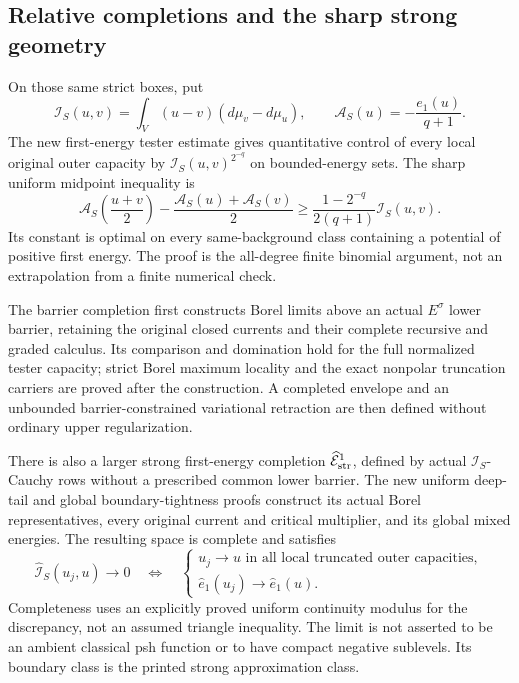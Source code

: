 \documentclass[11pt,a4paper]{article}
\numberwithin{equation}{section}
\theoremstyle{definition}
\theoremstyle{remark}
\begin{document}
\subsection{Relative completions and the sharp strong geometry}

On those same strict boxes, put
\[
 \mathscr I_S(u,v)=\int_V(u-v)(d\mu_v-d\mu_u),\qquad
 \mathscr A_S(u)=-\frac{e_1(u)}{q+1}.
 \tag{M12}
\]
The new first-energy tester estimate gives quantitative
control of every local original outer capacity by
$\mathscr I_S(u,v)^{2^{-q}}$ on bounded-energy sets.
The sharp uniform midpoint inequality is
\[
 \mathscr A_S\left(\frac{u+v}{2}\right)
       -\frac{\mathscr A_S(u)+\mathscr A_S(v)}2
      \geq\frac{1-2^{-q}}{2(q+1)}\mathscr I_S(u,v).
 \tag{M13}
\]
Its constant is optimal on every same-background class
containing a potential of positive first energy.
The proof is the all-degree finite binomial argument,
not an extrapolation from a finite numerical check.

The barrier completion first constructs Borel limits
above an actual $E^\sigma$ lower barrier, retaining
the original closed currents and their complete
recursive and graded calculus. Its comparison and
domination hold for the full normalized tester capacity;
strict Borel maximum locality and the exact nonpolar
truncation carriers are proved after the construction.
A completed envelope and an unbounded barrier-constrained
variational retraction are then defined without ordinary
upper regularization.

There is also a larger strong first-energy completion
$\widehat{\mathcal E}^1_{\rm str}$, defined by actual
$\mathscr I_S$-Cauchy rows without a prescribed common lower barrier.
The new uniform deep-tail and global boundary-tightness
proofs construct its actual Borel representatives, every
original current and critical multiplier, and its global
mixed energies. The resulting space is complete and satisfies
\[
 \widehat{\mathscr I}_S(u_j,u)\longrightarrow0
 \quad\Longleftrightarrow\quad
 \begin{cases}
 u_j\longrightarrow u\text{ in all local truncated outer capacities},\\
 \widehat e_1(u_j)\longrightarrow\widehat e_1(u).
 \end{cases}
 \tag{M14}
\]
Completeness uses an explicitly proved uniform continuity
modulus for the discrepancy, not an assumed triangle
inequality. The limit is not asserted to be an ambient
classical psh function or to have compact negative sublevels.
Its boundary class is the printed strong approximation class.
\end{document}
